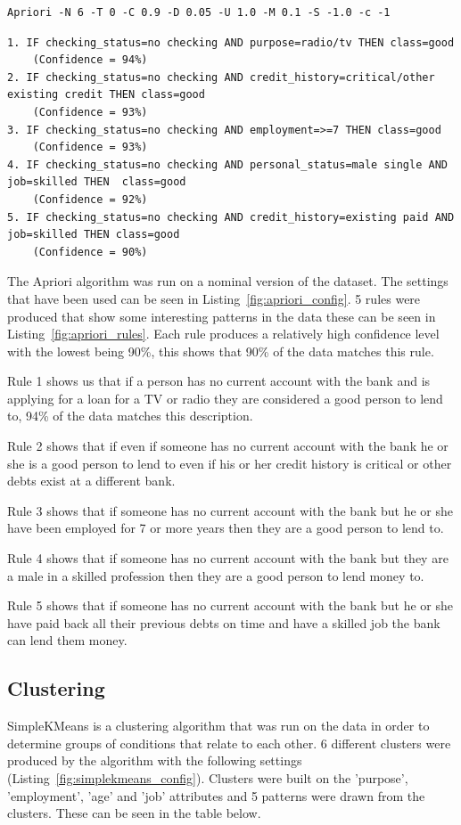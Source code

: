 \documentclass[12pt]{article}
\begin{document}
\begin{lstlisting}[caption="Apriori configuration"\label{fig:apriori_config}]
Apriori -N 6 -T 0 -C 0.9 -D 0.05 -U 1.0 -M 0.1 -S -1.0 -c -1
\end{lstlisting}
\begin{lstlisting}[caption="Apriori rules"\label{fig:apriori_rules}]
1. IF checking_status=no checking AND purpose=radio/tv THEN class=good 
    (Confidence = 94%)
2. IF checking_status=no checking AND credit_history=critical/other existing credit THEN class=good 
    (Confidence = 93%)
3. IF checking_status=no checking AND employment=>=7 THEN class=good 
    (Confidence = 93%)
4. IF checking_status=no checking AND personal_status=male single AND job=skilled THEN  class=good 
    (Confidence = 92%)
5. IF checking_status=no checking AND credit_history=existing paid AND job=skilled THEN class=good 
    (Confidence = 90%)

\end{lstlisting}
The Apriori algorithm was run on a nominal version of the dataset. The settings that have been used can be seen in Listing~\ref{fig:apriori_config}. 5 rules were produced that show some interesting patterns in the data these can be seen in Listing~\ref{fig:apriori_rules}. Each rule produces a relatively high confidence level with the lowest being 90\%, this shows that 90\% of the data matches this rule. 

Rule 1 shows us that if a person has no current account with the bank and is applying for a loan for a TV or radio they are considered a good person to lend to, 94\% of the data matches this description.

Rule 2 shows that if even if someone has no current account with the bank he or she is a good person to lend to even if his or her credit history is critical or other debts exist at a different bank.

Rule 3 shows that if someone has no current account with the bank but he or she have been employed for 7 or more years then they are a good person to lend to.

Rule 4 shows that if someone has no current account with the bank but they are a male in a skilled profession then they are a good person to lend money to.

Rule 5 shows that if someone has no current account with the bank but he or she have paid back all their previous debts on time and have a skilled job the bank can lend them money.

\subsection{Clustering}
SimpleKMeans is a clustering algorithm that was run on the data in order to determine groups of conditions that relate to each other. 6 different clusters were produced by the algorithm with the following settings (Listing~\ref{fig:simplekmeans_config}). Clusters were built on the 'purpose', 'employment', 'age' and 'job' attributes and 5 patterns were drawn from the clusters. These can be seen in the table below.
\end{document}
